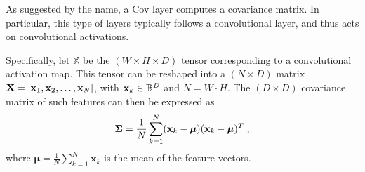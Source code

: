 



As suggested by the name, a Cov layer computes a covariance matrix. In particular, this type of layers typically follows a convolutional layer, and thus acts on convolutional activations.

Specifically, let $\mathbb{X}$ be the $(W \times H \times D)$ tensor corresponding to a convolutional activation map. This tensor can be reshaped into a $(N \times D)$ matrix $ {\bf X} = [ {\bf x}_1, {\bf x}_2, \dots, {\bf x}_N]$, with  ${\bf x}_k \in \mathbb{R}^D$ and $N=W\cdot H$. The $(D \times D)$ covariance matrix of such features can then be expressed as
\begin{equation} \label{eq:cov}
\boldsymbol{\Sigma} = \frac{1}{N} \sum_{k=1}^{N} ({\bf x}_k - \boldsymbol{\mu} )
({\bf x}_k - \boldsymbol{\mu} )^T \;,
\end{equation}
where $\boldsymbol{\mu} = \frac{1}{N} \sum_{k=1}^{N} \mathbf{x}_k$ is the mean of the feature vectors.

